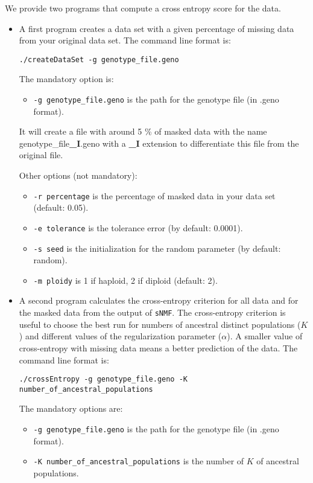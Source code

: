 \documentclass[10pt,a4paper]{article}
\begin{document}
We provide two programs that compute a cross entropy score for the data.
\begin{itemize}
\item A first program creates a data set with a given percentage of missing data from your original data set.
The command line format is:
\begin{Verbatim}[frame=single]
./createDataSet -g genotype_file.geno
\end{Verbatim}

The mandatory option is:
\begin{itemize}
\item \verb|-g genotype_file.geno| is the path for the genotype file (in .geno format).
\end{itemize}

It will create a file with around 5 \% of masked data with the name genotype\_file{\bf\_I}.geno with a {\bf\_I} extension to differentiate this file from the original file. 

\noindent
Other options (not mandatory):
\begin{itemize}
\item \verb|-r percentage| is the percentage of masked data in your data set (default: 0.05). 
\item \verb|-e tolerance| is the tolerance error (by default: 0.0001). 
\item \verb|-s seed| is the initialization for the random parameter (by default: random). 
\item \verb|-m ploidy| is 1 if haploid, 2 if diploid (default: 2). 
\end{itemize}

\item A second program calculates the cross-entropy criterion for all data and for the masked data from the 
output of {\tt sNMF}. The cross-entropy criterion is useful to choose the best run for numbers of 
ancestral distinct populations ($K$) and different values of the regularization parameter ($\alpha$). 
A smaller value of cross-entropy with missing data means a better prediction of the data.
The command line format is:
\begin{Verbatim}[frame=single]
./crossEntropy -g genotype_file.geno -K number_of_ancestral_populations
\end{Verbatim}

The mandatory options are:
\begin{itemize}
\item \verb|-g genotype_file.geno| is the path for the genotype file (in .geno format).
\item \verb|-K number_of_ancestral_populations| is the number of $K$ of ancestral populations.
\end{itemize}


\end{itemize}
\end{document}
